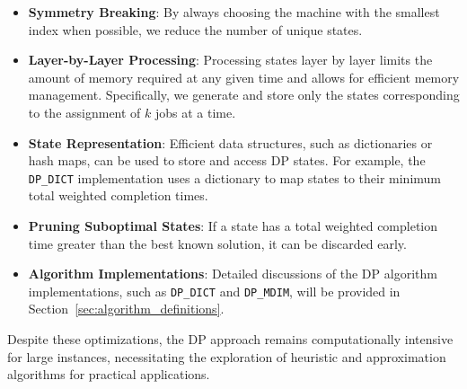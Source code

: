 \begin{itemize}
    \item \textbf{Symmetry Breaking}: By always choosing the machine with the smallest index when possible, we reduce the number of unique states.

    \item \textbf{Layer-by-Layer Processing}: Processing states layer by layer limits the amount of memory required at any given time and allows for efficient memory management. Specifically, we generate and store only the states corresponding to the assignment of $k$ jobs at a time.

    \item \textbf{State Representation}: Efficient data structures, such as dictionaries or hash maps, can be used to store and access DP states. For example, the \texttt{DP\_DICT} implementation uses a dictionary to map states to their minimum total weighted completion times.

    \item \textbf{Pruning Suboptimal States}: If a state has a total weighted completion time greater than the best known solution, it can be discarded early.

    \item \textbf{Algorithm Implementations}: Detailed discussions of the DP algorithm implementations, such as \texttt{DP\_DICT} and \texttt{DP\_MDIM}, will be provided in Section~\ref{sec:algorithm_definitions}.
\end{itemize}

Despite these optimizations, the DP approach remains computationally intensive for large instances, necessitating the exploration of heuristic and approximation algorithms for practical applications.
